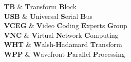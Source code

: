 \documentclass[12pt, twosides]{Thesis} %
\begin{document}
{  %
  \textbf{TB}    & \textbf{T}ransform \textbf{B}lock \\
  
  \textbf{USB}   & \textbf{U}niversal \textbf{S}erial \textbf{B}us \\
  
  \textbf{VCEG}  & \textbf{V}ideo \textbf{C}oding \textbf{E}xperts 
  \textbf{G}roup \\
  
  \textbf{VNC}   & \textbf{V}irtual \textbf{N}etwork \textbf{C}omputing \\
  
  \textbf{WHT}   & \textbf{W}alsh-\textbf{H}adamard \textbf{T}ransform \\
  \textbf{WPP}   & \textbf{W}avefront \textbf{P}arallel \textbf{P}rocessing \\
  
  
  
  
}


%
%


%
%
%
%
\end{document}
